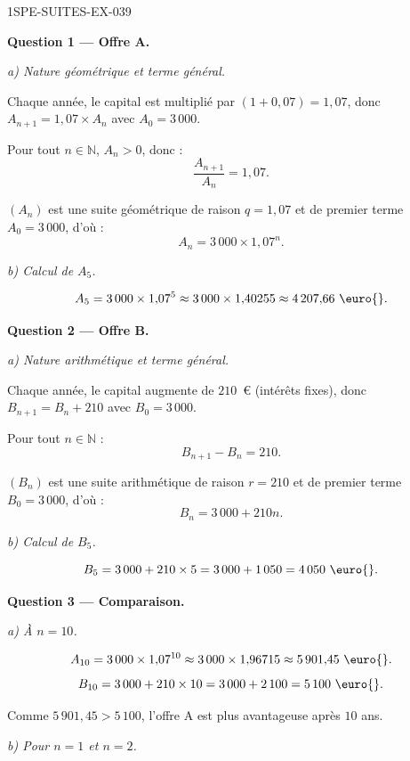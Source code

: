 \begin{corrige}{1SPE-SUITES-EX-039}

\textbf{Question 1 — Offre A.}

\textit{a) Nature géométrique et terme général.}

Chaque année, le capital est multiplié par $(1 + 0{,}07) = 1{,}07$, donc $A_{n+1} = 1{,}07 \times A_n$ avec $A_0 = 3\,000$.

Pour tout $n \in \mathbb{N}$, $A_n > 0$, donc :
\[
  \frac{A_{n+1}}{A_n} = 1{,}07.
\]


$(A_n)$ est une suite géométrique de raison $q = 1{,}07$ et de premier terme $A_0 = 3\,000$, d'où :
\[
  A_n = 3\,000 \times 1{,}07^n.
\]

\textit{b) Calcul de $A_5$.}

\[
  A_5 = 3\,000 \times 1{,}07^5 \approx 3\,000 \times 1{,}40255 \approx 4\,207{,}66 \text{ \euro{}}.
\]

\medskip
\textbf{Question 2 — Offre B.}

\textit{a) Nature arithmétique et terme général.}

Chaque année, le capital augmente de $210$~\euro{} (intérêts fixes), donc $B_{n+1} = B_n + 210$ avec $B_0 = 3\,000$.

Pour tout $n \in \mathbb{N}$ :
\[
  B_{n+1} - B_n = 210.
\]


$(B_n)$ est une suite arithmétique de raison $r = 210$ et de premier terme $B_0 = 3\,000$, d'où :
\[
  B_n = 3\,000 + 210n.
\]

\textit{b) Calcul de $B_5$.}

\[
  B_5 = 3\,000 + 210 \times 5 = 3\,000 + 1\,050 = 4\,050 \text{ \euro{}}.
\]

\medskip
\textbf{Question 3 — Comparaison.}

\textit{a) À $n = 10$.}

\[
  A_{10} = 3\,000 \times 1{,}07^{10} \approx 3\,000 \times 1{,}96715 \approx 5\,901{,}45 \text{ \euro{}}.
\]
\[
  B_{10} = 3\,000 + 210 \times 10 = 3\,000 + 2\,100 = 5\,100 \text{ \euro{}}.
\]

Comme $5\,901{,}45 > 5\,100$, l'offre A est plus avantageuse après $10$ ans.

\textit{b) Pour $n = 1$ et $n = 2$.}


\end{corrige}
